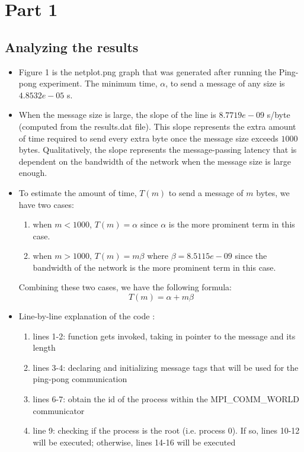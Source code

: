 \section{Part 1}
\label{sec:part1}

\subsection{Analyzing the results}

\begin{itemize}
	\item Figure 1 is the netplot.png graph that was generated after running the Ping-pong experiment. The minimum time, $\alpha$, to send a message of any size is $4.8532e-05$ s.
	\item When the message size is large, the slope of the line is $8.7719e-09$ s/byte (computed from the results.dat file). This slope represents the extra amount of time required to send every extra byte once the message size exceeds $1000$ bytes. Qualitatively, the slope represents the message-passing latency that is dependent on the bandwidth of the network when the message size is large enough.
	\item To estimate the amount of time, $T(m)$ to send a message of $m$ bytes, we have two cases:
	\begin{enumerate}
		\item when $m < 1000$, $ T(m) = \alpha $ since $\alpha$ is the more prominent term in this case.
		\item when $m > 1000$, $ T(m) = m\beta $ where $\beta = 8.5115e-09$ since the bandwidth of the network is the more prominent term in this case.
	\end{enumerate}
	Combining these two cases, we have the following formula: \\
	\[ T(m) = \alpha + m\beta \]
	\item Line-by-line explanation of the code :
	\begin{enumerate}
		\item lines 1-2: function gets invoked, taking in pointer to the message and its length
		\item lines 3-4: declaring and initializing message tags that will be used for the ping-pong communication
		\item lines 6-7: obtain the id of the process within the MPI\_COMM\_WORLD communicator
		\item line 9: checking if the process is the root (i.e. process 0). If so, lines 10-12 will be executed; otherwise, lines 14-16 will be executed

\end{enumerate}
\end{itemize}
